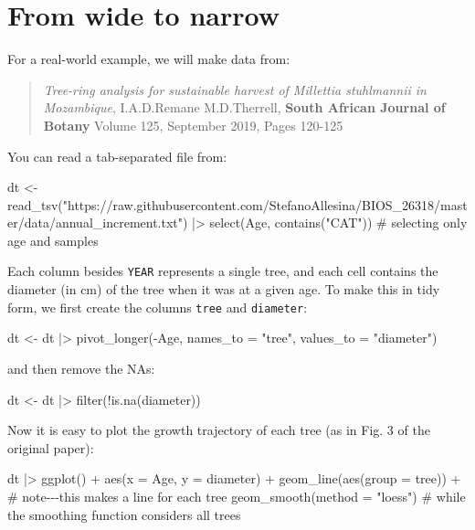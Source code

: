 \documentclass[
  letterpaper,
  DIV=11,
  numbers=noendperiod]{scrreprt}
\newenvironment{Shaded}{\begin{snugshade}}{\end{snugshade}}
\newcommand{\NormalTok}[1]{\textcolor[rgb]{0.00,0.23,0.31}{#1}}
\begin{document}
\section{From wide to narrow}\label{from-wide-to-narrow}

For a real-world example, we will make data from:

\begin{quote}
\emph{Tree-ring analysis for sustainable harvest of Millettia
stuhlmannii in Mozambique}, I.A.D.Remane M.D.Therrell, \textbf{South
African Journal of Botany} Volume 125, September 2019, Pages 120-125
\end{quote}

You can read a tab-separated file from:

\begin{Shaded}
\begin{Highlighting}[]
\NormalTok{dt \textless{}{-} read\_tsv("https://raw.githubusercontent.com/StefanoAllesina/BIOS\_26318/master/data/annual\_increment.txt") |\textgreater{} }
\NormalTok{  select(Age, contains("CAT"))}
\NormalTok{\# selecting only age and samples}
\end{Highlighting}
\end{Shaded}

Each column besides \texttt{YEAR} represents a single tree, and each
cell contains the diameter (in cm) of the tree when it was at a given
age. To make this in tidy form, we first create the columns
\texttt{tree} and \texttt{diameter}:

\begin{Shaded}
\begin{Highlighting}[]
\NormalTok{dt \textless{}{-} dt |\textgreater{} }
\NormalTok{  pivot\_longer({-}Age, names\_to = "tree", values\_to = "diameter")}
\end{Highlighting}
\end{Shaded}

and then remove the NAs:

\begin{Shaded}
\begin{Highlighting}[]
\NormalTok{dt \textless{}{-} dt |\textgreater{} filter(!is.na(diameter))}
\end{Highlighting}
\end{Shaded}

Now it is easy to plot the growth trajectory of each tree (as in Fig. 3
of the original paper):

\begin{Shaded}
\begin{Highlighting}[]
\NormalTok{dt |\textgreater{} }
\NormalTok{  ggplot() + }
\NormalTok{  aes(x = Age, y = diameter) + }
\NormalTok{  geom\_line(aes(group = tree)) + \# note{-}{-}{-}this makes a line for each tree}
\NormalTok{  geom\_smooth(method = "loess") \# while the smoothing function considers all trees}
\end{Highlighting}
\end{Shaded}
\end{document}
